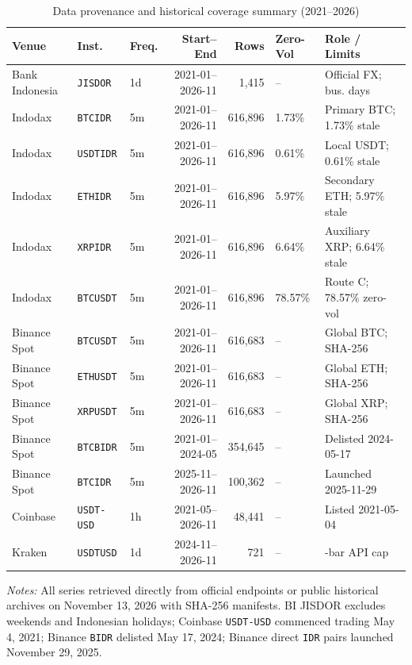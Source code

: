 \begin{table}[htbp]
\centering
\caption{Data provenance and historical coverage summary (2021--2026)}
\label{tab:coverage}
\fontsize{6.6}{7.8}\selectfont\setlength{\tabcolsep}{1.8pt}
\begingroup
\begin{tabular}{@{}>{\raggedright\arraybackslash}p{1.9cm}llrrl>{\raggedright\arraybackslash}p{2.3cm}@{}}
\toprule
Venue & Inst. & Freq. & Start--End & Rows & Zero-Vol & Role / Limits \\
\midrule
Bank Indonesia & \texttt{JISDOR} & 1d & 2021-01--2026-11 & 1,415 & -- & Official FX; bus. days \\
Indodax & \texttt{BTCIDR} & 5m & 2021-01--2026-11 & 616,896 & 1.73\% & Primary BTC; 1.73\% stale \\
Indodax & \texttt{USDTIDR} & 5m & 2021-01--2026-11 & 616,896 & 0.61\% & Local USDT; 0.61\% stale \\
Indodax & \texttt{ETHIDR} & 5m & 2021-01--2026-11 & 616,896 & 5.97\% & Secondary ETH; 5.97\% stale \\
Indodax & \texttt{XRPIDR} & 5m & 2021-01--2026-11 & 616,896 & 6.64\% & Auxiliary XRP; 6.64\% stale \\
Indodax & \texttt{BTCUSDT} & 5m & 2021-01--2026-11 & 616,896 & 78.57\% & Route C; 78.57\% zero-vol \\
Binance Spot & \texttt{BTCUSDT} & 5m & 2021-01--2026-11 & 616,683 & -- & Global BTC; SHA-256 \\
Binance Spot & \texttt{ETHUSDT} & 5m & 2021-01--2026-11 & 616,683 & -- & Global ETH; SHA-256 \\
Binance Spot & \texttt{XRPUSDT} & 5m & 2021-01--2026-11 & 616,683 & -- & Global XRP; SHA-256 \\
Binance Spot & \texttt{BTCBIDR} & 5m & 2021-01--2024-05 & 354,645 & -- & Delisted 2024-05-17 \\
Binance Spot & \texttt{BTCIDR} & 5m & 2025-11--2026-11 & 100,362 & -- & Launched 2025-11-29 \\
Coinbase & \texttt{USDT-USD} & 1h & 2021-05--2026-11 & 48,441 & -- & Listed 2021-05-04 \\
Kraken & \texttt{USDTUSD} & 1d & 2024-11--2026-11 & 721 & -- & 720-bar API cap \\
\bottomrule
\end{tabular}\endgroup
\begin{minipage}{\textwidth}\footnotesize\vspace{3pt}
\emph{Notes:} All series retrieved directly from official endpoints or public historical archives on November 13, 2026 with SHA-256 manifests. BI JISDOR excludes weekends and Indonesian holidays; Coinbase \texttt{USDT-USD} commenced trading May 4, 2021; Binance \texttt{BIDR} delisted May 17, 2024; Binance direct \texttt{IDR} pairs launched November 29, 2025.
\end{minipage}
\end{table}
